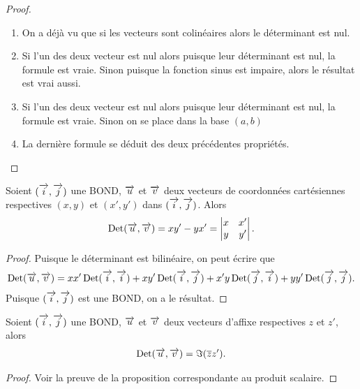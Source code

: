 \begin{proof}
    \begin{enumerate}
        \item On a déjà vu que si les vecteurs sont colinéaires alors le 
            déterminant est nul.
        \item Si l'un des deux vecteur est nul alors puisque leur déterminant 
            est nul, la formule est vraie. Sinon puisque la fonction sinus est 
            impaire, alors le résultat est vrai aussi.
        \item Si l'un des deux vecteur est nul alors puisque leur déterminant 
            est nul, la formule est vraie. Sinon on se place dans la base 
            \((a, b)\)
        \item La dernière formule se déduit des deux précédentes propriétés.
    \end{enumerate}
\end{proof}

\begin{prop}
    Soient \((\overrightarrow{i} , \overrightarrow{j})\) une BOND, \(\overrightarrow{u}\) et \(\overrightarrow{v}\) deux vecteurs de 
    coordonnées cartésiennes respectives \((x , y)\) et \((x',y')\) dans 
    \((\overrightarrow{i} , \overrightarrow{j})\). Alors \begin{equation}
        \operatorname{Det}(\overrightarrow{u} , \overrightarrow{v}) = xy'-yx' = \begin{vmatrix} x&x'\\y&y'\end{vmatrix}.
    \end{equation}
\end{prop}

\begin{proof}
    Puisque le déterminant est bilinéaire, on peut écrire que
    \begin{equation}
        \operatorname{Det}(\overrightarrow{u} , \overrightarrow{v}) = xx' \operatorname{Det}(\overrightarrow{i} , \overrightarrow{i}) + xy' \operatorname{Det}(\overrightarrow{i} , \overrightarrow{j}) + x'y\operatorname{Det}(\overrightarrow{j} , \overrightarrow{i}) 
        + yy'\operatorname{Det}(\overrightarrow{j} , \overrightarrow{j}).
    \end{equation}
    Puisque \((\overrightarrow{i} , \overrightarrow{j})\) est une BOND, on a le résultat.
\end{proof}

\begin{prop}
    Soient \((\overrightarrow{i} , \overrightarrow{j})\) une BOND, \(\overrightarrow{u}\) et \(\overrightarrow{v}\) deux vecteurs d'affixe 
    respectives \(z\) et \(z'\), alors 
    \begin{equation}
        \operatorname{Det}(\overrightarrow{u} , \overrightarrow{v}) = \Im(\overline{z}z').
    \end{equation}
\end{prop}

\begin{proof}
    Voir la preuve de la proposition correspondante au produit scalaire.
\end{proof}

